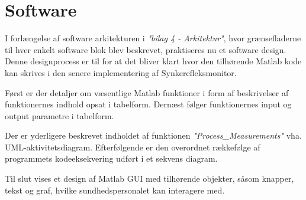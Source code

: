 	
	
\chapter{Software}
I forlængelse af software arkitekturen i \textit{"bilag 4 - Arkitektur"}, hvor grænsefladerne til hver enkelt software blok blev beskrevet,  praktiseres nu et software design. Denne designprocess er til for at det bliver klart hvor den tilhørende Matlab kode kan skrives i den senere implementering af Synkerefleksmonitor.

Først er der detaljer om væsentlige Matlab funktioner i form af beskrivelser af funktionernes indhold opsat i tabelform. Dernæst følger funktionernes input og output parametre i tabelform.

Der er yderligere beskrevet indholdet af funktionen \textit{"Process\_Measurements"} vha. UML-aktivitetsdiagram. Efterfølgende er den overordnet rækkefølge af programmets kodeeksekvering udført i et sekvens diagram.

Til slut vises et design af Matlab GUI med tilhørende objekter, såsom knapper, tekst og graf, hvilke sundhedspersonalet kan interagere med. 


